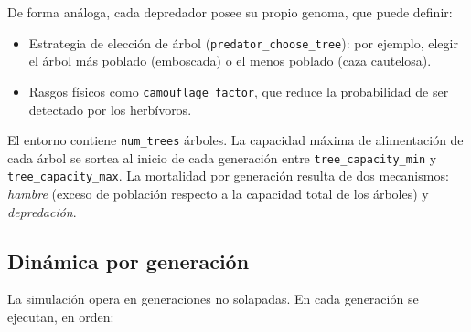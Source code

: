 \documentclass[11pt,a4paper]{article}
\begin{document}
De forma an\'aloga, cada depredador posee su propio genoma, que puede definir:
\begin{itemize}
    \item Estrategia de elecci\'on de \'arbol (\texttt{predator\_choose\_tree}): por ejemplo, elegir
    el \'arbol m\'as poblado (emboscada) o el menos poblado (caza cautelosa).
    \item Rasgos f\'isicos como \texttt{camouflage\_factor}, que reduce la probabilidad de ser
    detectado por los herb\'ivoros.
\end{itemize}

El entorno contiene \texttt{num\_trees} \'arboles. La capacidad m\'axima de alimentaci\'on de cada \'arbol
se sortea al inicio de cada generaci\'on entre \texttt{tree\_capacity\_min} y \texttt{tree\_capacity\_max}.
La mortalidad por generaci\'on resulta de dos mecanismos: \textit{hambre} (exceso de poblaci\'on respecto a
la capacidad total de los \'arboles) y \textit{depredaci\'on}.

\subsection{Din\'amica por generaci\'on}

La simulaci\'on opera en generaciones no solapadas. En cada generaci\'on se ejecutan, en orden:
\end{document}
